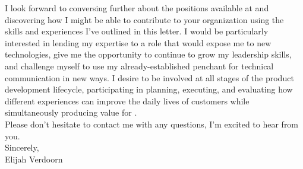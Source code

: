 \noindent I look forward to conversing further about the positions available at \company \space and discovering how I might be able to contribute to your organization using the skills and experiences I've outlined in this letter. I would be particularly interested in lending my expertise to a role that would expose me to new technologies, give me the opportunity to continue to grow my leadership skills, and challenge myself to use my already-established penchant for technical communication in new ways. I desire to be involved at all stages of the product development lifecycle, participating in planning, executing, and evaluating how different experiences can improve the daily lives of customers while simultaneously producing value for \company.\\

\noindent Please don't hesitate to contact me with any questions, I'm excited to hear from you.\\

\noindent Sincerely,
\\\noindent
Elijah Verdoorn

